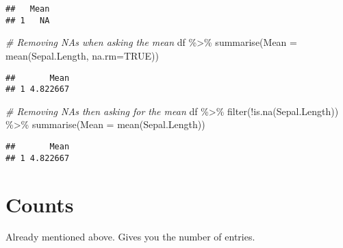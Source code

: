 \documentclass[
]{book}
\newenvironment{Shaded}{\begin{snugshade}}{\end{snugshade}}
\newcommand{\AttributeTok}[1]{\textcolor[rgb]{0.77,0.63,0.00}{#1}}
\newcommand{\CommentTok}[1]{\textcolor[rgb]{0.56,0.35,0.01}{\textit{#1}}}
\newcommand{\ConstantTok}[1]{\textcolor[rgb]{0.00,0.00,0.00}{#1}}
\newcommand{\FunctionTok}[1]{\textcolor[rgb]{0.00,0.00,0.00}{#1}}
\newcommand{\NormalTok}[1]{#1}
\newcommand{\OtherTok}[1]{\textcolor[rgb]{0.56,0.35,0.01}{#1}}
\newcommand{\SpecialCharTok}[1]{\textcolor[rgb]{0.00,0.00,0.00}{#1}}
\begin{document}
\begin{Shaded}
\end{Shaded}

\begin{verbatim}
##   Mean
## 1   NA
\end{verbatim}

\begin{Shaded}
\begin{Highlighting}[]
\CommentTok{\# Removing NAs when asking the mean}
\NormalTok{df }\SpecialCharTok{\%\textgreater{}\%} 
  \FunctionTok{summarise}\NormalTok{(}\AttributeTok{Mean =} \FunctionTok{mean}\NormalTok{(Sepal.Length, }\AttributeTok{na.rm=}\ConstantTok{TRUE}\NormalTok{))}
\end{Highlighting}
\end{Shaded}

\begin{verbatim}
##       Mean
## 1 4.822667
\end{verbatim}

\begin{Shaded}
\begin{Highlighting}[]
\CommentTok{\# Removing NAs then asking for the mean}
\NormalTok{df }\SpecialCharTok{\%\textgreater{}\%} 
  \FunctionTok{filter}\NormalTok{(}\SpecialCharTok{!}\FunctionTok{is.na}\NormalTok{(Sepal.Length)) }\SpecialCharTok{\%\textgreater{}\%} 
  \FunctionTok{summarise}\NormalTok{(}\AttributeTok{Mean =} \FunctionTok{mean}\NormalTok{(Sepal.Length))}
\end{Highlighting}
\end{Shaded}

\begin{verbatim}
##       Mean
## 1 4.822667
\end{verbatim}

\hypertarget{counts}{%
\section{Counts}\label{counts}}

Already mentioned above. Gives you the number of entries.
\end{document}
